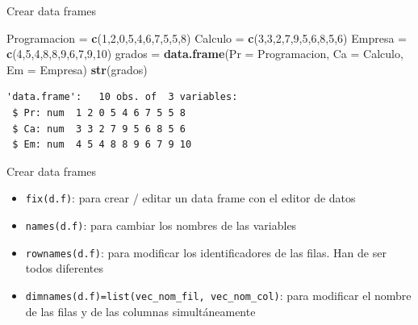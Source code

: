 \documentclass[
  ignorenonframetext,
]{beamer}
\newenvironment{Shaded}{\begin{snugshade}}{\end{snugshade}}
\newcommand{\AttributeTok}[1]{\textcolor[rgb]{0.13,0.29,0.53}{#1}}
\newcommand{\DecValTok}[1]{\textcolor[rgb]{0.00,0.00,0.81}{#1}}
\newcommand{\FunctionTok}[1]{\textcolor[rgb]{0.13,0.29,0.53}{\textbf{#1}}}
\newcommand{\NormalTok}[1]{#1}
\newcommand{\OtherTok}[1]{\textcolor[rgb]{0.56,0.35,0.01}{#1}}
\providecommand{\tightlist}{%
  \setlength{\itemsep}{0pt}\setlength{\parskip}{0pt}}
\begin{document}
\begin{frame}[fragile]{Crear data frames}
\label{crear-data-frames-1}
\begin{Shaded}
\begin{Highlighting}[]
\NormalTok{Programacion }\OtherTok{=} \FunctionTok{c}\NormalTok{(}\DecValTok{1}\NormalTok{,}\DecValTok{2}\NormalTok{,}\DecValTok{0}\NormalTok{,}\DecValTok{5}\NormalTok{,}\DecValTok{4}\NormalTok{,}\DecValTok{6}\NormalTok{,}\DecValTok{7}\NormalTok{,}\DecValTok{5}\NormalTok{,}\DecValTok{5}\NormalTok{,}\DecValTok{8}\NormalTok{)}
\NormalTok{Calculo }\OtherTok{=} \FunctionTok{c}\NormalTok{(}\DecValTok{3}\NormalTok{,}\DecValTok{3}\NormalTok{,}\DecValTok{2}\NormalTok{,}\DecValTok{7}\NormalTok{,}\DecValTok{9}\NormalTok{,}\DecValTok{5}\NormalTok{,}\DecValTok{6}\NormalTok{,}\DecValTok{8}\NormalTok{,}\DecValTok{5}\NormalTok{,}\DecValTok{6}\NormalTok{)}
\NormalTok{Empresa }\OtherTok{=} \FunctionTok{c}\NormalTok{(}\DecValTok{4}\NormalTok{,}\DecValTok{5}\NormalTok{,}\DecValTok{4}\NormalTok{,}\DecValTok{8}\NormalTok{,}\DecValTok{8}\NormalTok{,}\DecValTok{9}\NormalTok{,}\DecValTok{6}\NormalTok{,}\DecValTok{7}\NormalTok{,}\DecValTok{9}\NormalTok{,}\DecValTok{10}\NormalTok{)}
\NormalTok{grados }\OtherTok{=} \FunctionTok{data.frame}\NormalTok{(}\AttributeTok{Pr =}\NormalTok{ Programacion, }
                    \AttributeTok{Ca =}\NormalTok{ Calculo, }\AttributeTok{Em =}\NormalTok{ Empresa)}
\FunctionTok{str}\NormalTok{(grados)}
\end{Highlighting}
\end{Shaded}

\begin{verbatim}
'data.frame':   10 obs. of  3 variables:
 $ Pr: num  1 2 0 5 4 6 7 5 5 8
 $ Ca: num  3 3 2 7 9 5 6 8 5 6
 $ Em: num  4 5 4 8 8 9 6 7 9 10
\end{verbatim}
\end{frame}

\begin{frame}[fragile]{Crear data frames}
\label{crear-data-frames-2}
\begin{itemize}
\tightlist
\item
  \texttt{fix(d.f)}: para crear / editar un data frame con el editor de
  datos
\item
  \texttt{names(d.f)}: para cambiar los nombres de las variables
\item
  \texttt{rownames(d.f)}: para modificar los identificadores de las
  filas. Han de ser todos diferentes
\item
  \texttt{dimnames(d.f)=list(vec\_nom\_fil,\ vec\_nom\_col)}: para
  modificar el nombre de las filas y de las columnas simultáneamente
\end{itemize}
\end{frame}
\end{document}

